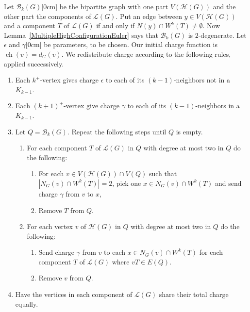 \documentclass[12pt]{article}
\theoremstyle{plain}
\theoremstyle{definition}
\theoremstyle{remark}
\newcommand{\fancy}[1]{\mathcal{#1}}
\newcommand{\B}{\fancy{B}}
\renewcommand{\L}{\fancy{L}}
\newcommand{\HH}{\fancy{H}}
\newcommand{\card}[1]{\left|#1\right|}
\newcommand{\ch}{\operatorname{ch}}
\newcommand{\aside}[1]{\marginnote{\scriptsize{#1}}[0cm]}
\begin{document}
Let $\B_k(G)$\aside{$\B_k(G)$} be the bipartite graph with one part $V(\HH(G))$
and the other part the components of $\L(G)$.  Put an edge between $y \in
V(\HH(G))$ and a component $T$ of $\L(G)$ if and only if $N(y) \cap W^k(T) \ne
\emptyset$.  Now Lemma~\ref{MultipleHighConfigurationEuler} says that $\B_k(G)$
is $2$-degenerate.
%
Let $\epsilon$ and $\gamma$\aside{$\epsilon, \gamma$} be parameters, to be
chosen. Our initial charge function is $\ch(v) = d_G(v)$.  We
redistribute charge according to the following rules, applied successively.  
\begin{enumerate}
	\item Each $k^+$-vertex gives charge $\epsilon$ to each of its $(k-1)$-neighbors not in a $K_{k-1}$.
	\item Each $(k+1)^+$-vertex give charge $\gamma$ to each of its $(k-1)$-neighbors in a $K_{k-1}$.
	\item Let $Q = \B_k(G)$.  Repeat the following steps until $Q$ is empty.
	  \begin{enumerate}
	  	\item For each component $T$ of $\L(G)$ in $Q$ with degree at most two in $Q$ do the following:
	  	    \begin{enumerate}
	  	    	\item For each $v \in V(\HH(G)) \cap V(Q)$ such that $\card{N_G(v) \cap W^k(T)} = 2$, pick one $x \in N_G(v) \cap W^k(T)$ and send charge $\gamma$ from $v$ to $x$,
	  	    	\item Remove $T$ from $Q$.
	  	    \end{enumerate}
	  	\item For each vertex $v$ of $\HH(G)$ in $Q$ with degree at most two in $Q$ do the following:  
	  	    \begin{enumerate}
	  	        \item Send charge $\gamma$ from $v$ to each $x \in N_G(v) \cap W^k(T)$ for each component $T$ of $\L(G)$ where $vT \in E(Q)$.
	  	        \item Remove $v$ from $Q$.
	        \end{enumerate}
	  \end{enumerate}
	\item Have the vertices in each component of $\L(G)$ share their total charge equally.
\end{enumerate}
\end{document}
